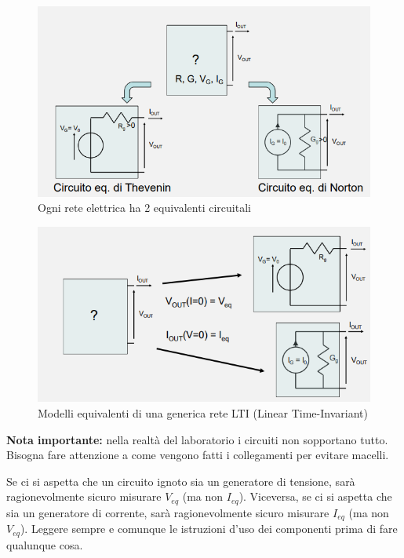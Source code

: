\documentclass{article}
\begin{document}
\begin{figure}[h]
  \centering
  \includegraphics[scale=0.6]{IM_Thevenin_Norton_ter}
  \caption{Ogni rete elettrica ha 2 equivalenti circuitali}
  \label{Schema_Thevenin_Norton_ter}
\end{figure}

\begin{figure}[h]
  \centering
  \includegraphics[scale=0.65]{IM_Thevenin_Norton_quater}
  \caption{Modelli equivalenti di una generica rete LTI (Linear Time-Invariant)}
  \label{Schema_Thevenin_Norton_quater}
\end{figure}

\textbf{Nota importante:} nella realtà del laboratorio i circuiti non sopportano tutto. Bisogna fare attenzione a come vengono fatti i collegamenti per evitare macelli.

\vspace{1mm}

Se ci si aspetta che un circuito ignoto sia un generatore di tensione, sarà ragionevolmente sicuro misurare $V_{eq}$ (ma non $I_{eq}$). Viceversa, se ci si aspetta che sia un generatore di corrente, sarà ragionevolmente sicuro misurare $I_{eq}$ (ma non $V_{eq}$). Leggere sempre e comunque le istruzioni d'uso dei componenti prima di fare qualunque cosa.
\end{document}
